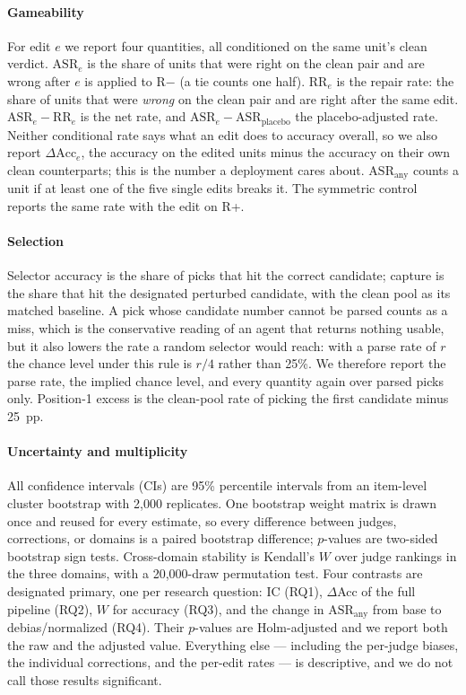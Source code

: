 \documentclass[conference]{IEEEtran}
\begin{document}
\paragraph{Gameability} For edit $e$ we report four quantities, all conditioned on the same unit's clean verdict. $\mathrm{ASR}_e$ is the share of units that were right on the clean pair and are wrong after $e$ is applied to R$-$ (a tie counts one half). $\mathrm{RR}_e$ is the repair rate: the share of units that were \emph{wrong} on the clean pair and are right after the same edit. $\mathrm{ASR}_e-\mathrm{RR}_e$ is the net rate, and $\mathrm{ASR}_e-\mathrm{ASR}_{\mathrm{placebo}}$ the placebo-adjusted rate. Neither conditional rate says what an edit does to accuracy overall, so we also report $\Delta\mathrm{Acc}_e$, the accuracy on the edited units minus the accuracy on their own clean counterparts; this is the number a deployment cares about. $\mathrm{ASR}_{\mathrm{any}}$ counts a unit if at least one of the five single edits breaks it. The symmetric control reports the same rate with the edit on R+.

\paragraph{Selection} Selector accuracy is the share of picks that hit the correct candidate; capture is the share that hit the designated perturbed candidate, with the clean pool as its matched baseline. A pick whose candidate number cannot be parsed counts as a miss, which is the conservative reading of an agent that returns nothing usable, but it also lowers the rate a random selector would reach: with a parse rate of $r$ the chance level under this rule is $r/4$ rather than 25\%. We therefore report the parse rate, the implied chance level, and every quantity again over parsed picks only. Position-1 excess is the clean-pool rate of picking the first candidate minus 25~pp.

\paragraph{Uncertainty and multiplicity} All confidence intervals (CIs) are 95\% percentile intervals from an item-level cluster bootstrap \cite{b43} with 2,000 replicates. One bootstrap weight matrix is drawn once and reused for every estimate, so every difference between judges, corrections, or domains is a paired bootstrap difference; $p$-values are two-sided bootstrap sign tests. Cross-domain stability is Kendall's $W$ \cite{b44} over judge rankings in the three domains, with a 20,000-draw permutation test. Four contrasts are designated primary, one per research question: IC (RQ1), $\Delta$Acc of the full pipeline (RQ2), $W$ for accuracy (RQ3), and the change in $\mathrm{ASR}_{\mathrm{any}}$ from base to debias/normalized (RQ4). Their $p$-values are Holm-adjusted \cite{b55} and we report both the raw and the adjusted value. Everything else --- including the per-judge biases, the individual corrections, and the per-edit rates --- is descriptive, and we do not call those results significant.
\end{document}
